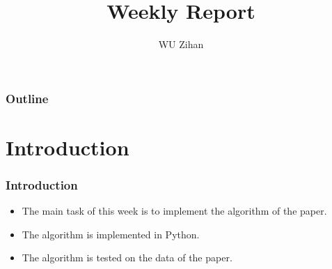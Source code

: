 \documentclass{beamer}
\title{Weekly Report}
\author{WU Zihan}
\begin{document}
\maketitle
\begin{frame}
    \frametitle{Outline}
    \tableofcontents
\end{frame}

\section{Introduction}
\begin{frame}
    \frametitle{Introduction}
    \begin{itemize}
        \item The main task of this week is to implement the algorithm of the paper.
        \item The algorithm is implemented in Python.
        \item The algorithm is tested on the data of the paper.
    \end{itemize}
\end{frame}
\end{document}
